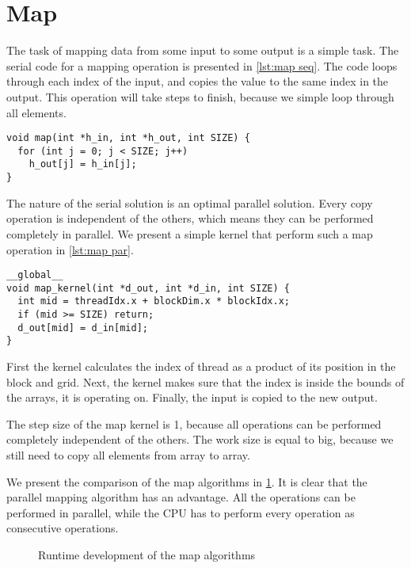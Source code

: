 \section{Map}
\label{sec:map}

The task of mapping data from some input to some output is a simple task.
The serial code for a mapping operation is presented in \cref{lst:map seq}.
The code loops through each index of the input, and copies the value to the same index in the output.
This operation will take  steps to finish, because we simple loop through all elements.

\begin{lstlisting}[caption={Serial map}, label={lst:map seq}]
void map(int *h_in, int *h_out, int SIZE) {
  for (int j = 0; j < SIZE; j++) 
    h_out[j] = h_in[j];
}
\end{lstlisting}

The nature of the serial solution is an optimal parallel solution.
Every copy operation is independent of the others, which means they can be performed completely in parallel.
We present a simple kernel that perform such a map operation in \cref{lst:map par}.

\begin{lstlisting}[caption={Map kernel}, label={lst:map par}]
__global__ 
void map_kernel(int *d_out, int *d_in, int SIZE) {
  int mid = threadIdx.x + blockDim.x * blockIdx.x;
  if (mid >= SIZE) return;
  d_out[mid] = d_in[mid];
}
\end{lstlisting}

First the kernel calculates the index of thread as a product of its position in the block and grid.
Next, the kernel makes sure that the index is inside the bounds of the arrays, it is operating on.
Finally, the input is copied to the new output.

The step size of the map kernel is 1, because all operations can be performed completely independent of the others.
The work size is equal to  big, because we still need to copy all elements from array to array.

We present the comparison of the map algorithms in \cref{fig:map plot}.
It is clear that the parallel mapping algorithm has an advantage.
All the operations can be performed in parallel, while the CPU has to perform every operation as consecutive operations.

\begin{figure}[htb]
  \centering
  
  \caption{Runtime development of the map algorithms}
  \label{fig:map plot}
\end{figure}
